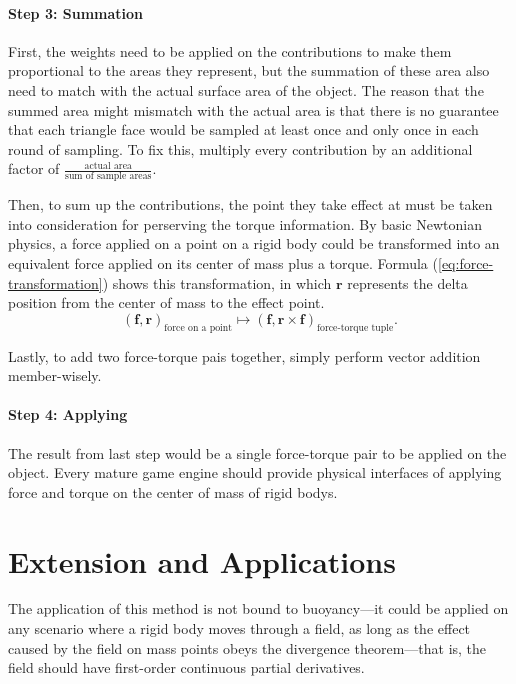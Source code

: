 \documentclass{article}
\begin{document}
\paragraph*{Step 3: Summation}

First, the weights need to be applied on the contributions to make them proportional to the areas they represent, but the summation of these area also need to match with the actual surface area of the object.
The reason that the summed area might mismatch with the actual area is that there is no guarantee that each triangle face would be sampled at least once and only once in each round of sampling.
To fix this, multiply every contribution by an additional factor of $\frac{\text{actual area}}{\text{sum of sample areas}}$.

Then, to sum up the contributions, the point they take effect at must be taken into consideration for perserving the torque information.
By basic Newtonian physics, a force applied on a point on a rigid body could be transformed into an equivalent force applied on its center of mass plus a torque.
Formula (\ref{eq:force-transformation}) shows this transformation, in which $\mathbf r$ represents the delta position from the center of mass to the effect point.
\begin{equation}
	(\mathbf f,\mathbf r)_{\text{force on a point}}\mapsto(\mathbf f,\mathbf r\times\mathbf f)_{\text{force-torque tuple}}.
	\label{eq:force-transformation}
\end{equation}

Lastly, to add two force-torque pais together, simply perform vector addition member-wisely.

\paragraph*{Step 4: Applying}

The result from last step would be a single force-torque pair to be applied on the object.
Every mature game engine should provide physical interfaces of applying force and torque on the center of mass of rigid bodys.

\section{Extension and Applications}

The application of this method is not bound to buoyancy---it could be applied on any scenario where a rigid body moves through a field, as long as the effect caused by the field on mass points obeys the divergence theorem---that is, the field should have first-order continuous partial derivatives.
\end{document}
